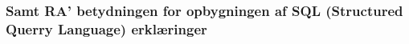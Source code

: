 






\subsubsection{Samt RA' betydningen for opbygningen af  SQL (Structured Querry Language) erklæringer}



















